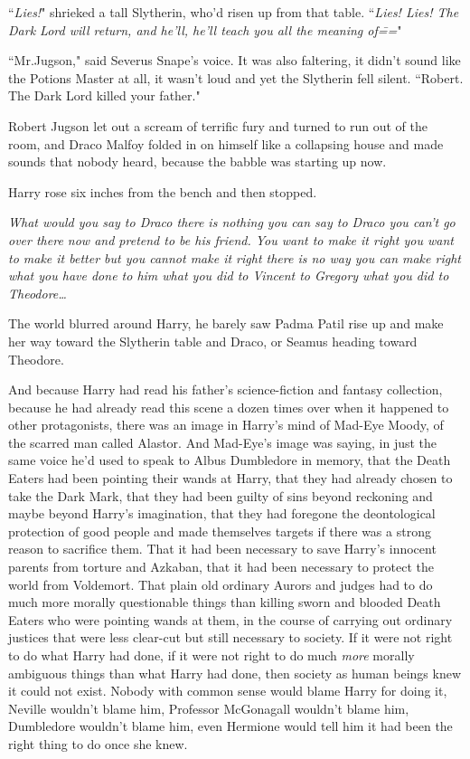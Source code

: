 ``\emph{Lies!}" shrieked a tall Slytherin, who'd risen up from that table. ``\emph{Lies! Lies! The Dark Lord will return, and he'll, he'll teach you all the meaning of\===}"

``Mr.\?Jugson," said Severus Snape's voice. It was also faltering, it didn't sound like the Potions Master at all, it wasn't loud and yet the Slytherin fell silent. ``Robert. The Dark Lord killed your father."

Robert Jugson let out a scream of terrific fury and turned to run out of the room, and Draco Malfoy folded in on himself like a collapsing house and made sounds that nobody heard, because the babble was starting up now.

Harry rose six inches from the bench and then stopped.

\emph{What would you say to Draco there is nothing you can say to Draco you can't go over there now and pretend to be his friend. You want to make it right you want to make it better but you cannot make it right there is no way you can make right what you have done to him what you did to Vincent to Gregory what you did to Theodore{\ldots}}

The world blurred around Harry, he barely saw Padma Patil rise up and make her way toward the Slytherin table and Draco, or Seamus heading toward Theodore.

And because Harry had read his father's science-fiction and fantasy collection, because he had already read this scene a dozen times over when it happened to other protagonists, there was an image in Harry's mind of Mad-Eye Moody, of the scarred man called Alastor. And Mad-Eye's image was saying, in just the same voice he'd used to speak to Albus Dumbledore in memory, that the Death Eaters had been pointing their wands at Harry, that they had already chosen to take the Dark Mark, that they had been guilty of sins beyond reckoning and maybe beyond Harry's imagination, that they had foregone the deontological protection of good people and made themselves targets if there was a strong reason to sacrifice them. That it had been necessary to save Harry's innocent parents from torture and Azkaban, that it had been necessary to protect the world from Voldemort. That plain old ordinary Aurors and judges had to do much more morally questionable things than killing sworn and blooded Death Eaters who were pointing wands at them, in the course of carrying out ordinary justices that were less clear-cut but still necessary to society. If it were not right to do what Harry had done, if it were not right to do much \emph{more} morally ambiguous things than what Harry had done, then society as human beings knew it could not exist. Nobody with common sense would blame Harry for doing it, Neville wouldn't blame him, Professor McGonagall wouldn't blame him, Dumbledore wouldn't blame him, even Hermione would tell him it had been the right thing to do once she knew.

